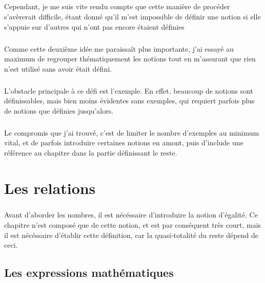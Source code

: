 \documentclass[a4paper]{book}
\begin{document}
    \paragraph{}
    Cependant, je me suis vite rendu compte que cette manière de procéder s'avèrerait difficile, étant donné qu'il m'est impossible de définir une notion si elle s'appuie sur d'autres qui n'ont pas encore étaient définies
    \paragraph{}
    Comme cette deuxième idée me paraissaît plus importante, j'ai essayé au maximum de regrouper thématiquement les notions tout en m'assurant que rien n'est utilisé sans avoir était défini.
    \paragraph{}
    L'obstacle principale à ce défi est l'exemple. En effet, beaucoup de notions sont définissables, mais bien moins évidentes sans exemples, qui requiert parfois plus de notions que définies jusqu'alors.
    \paragraph{}
    Le compromis que j'ai trouvé, c'est de limiter le nombre d'exemples au minimum vital, et de parfois introduire certaines notions en amont, puis d'include une référence au chapitre dans la partie définissant le reste. %
    \chapter{Les relations}
    \paragraph{}
    Avant d'aborder les nombres, il est nécéssaire d'introduire la notion d'égalité. Ce chapitre n'est composé que de cette notion, et est par conséquent très court, mais il est nécéssaire d'établir cette définition, car la quasi-totalité du reste dépend de ceci.
    \section{Les expressions mathématiques}
\end{document}
